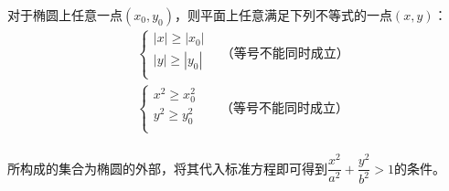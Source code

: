 \documentclass[UTF8]{ctexart}
\begin{document}
    对于椭圆上任意一点$(x_0,y_0)$，则平面上任意满足下列不等式的一点$(x,y)$：\vspace{5pt}
    \setcounter{equation}{0}
    \begin{align}
        &\begin{cases}
            |x|\geq|x_0|\\[1mm]
            |y|\geq|y_0|\\[1mm]
        \end{cases}~~~~\text{（等号不能同时成立）}\\[6mm]
        &\begin{cases}
            x^2\geq x_0^2\\[1mm]
            y^2\geq y_0^2\\[1mm]
        \end{cases}~~~~~~~\text{（等号不能同时成立）}
    \end{align}\\
    所构成的集合为椭圆的外部，将其代入标准方程即可得到$\dfrac{x^2}{a^2}+\dfrac{y^2}{b^2}>1$的条件。

\newpage
\end{document}
